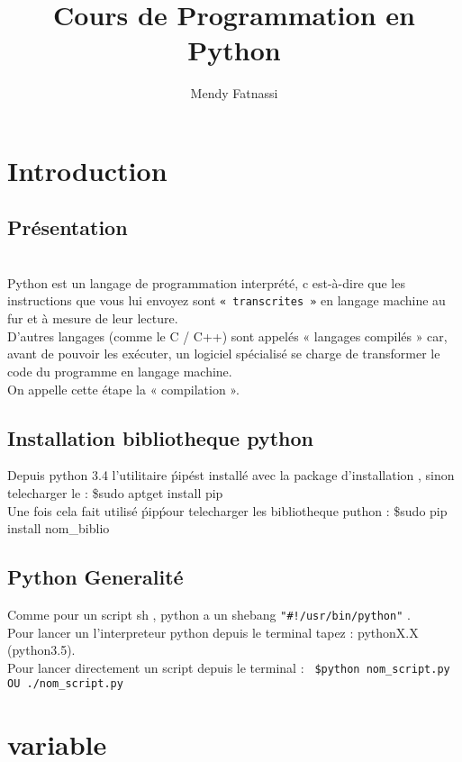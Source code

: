 \documentclass[a4paper,12pt,openany]{book}
\author{Mendy Fatnassi}
\title{Cours de Programmation en Python}
\begin{document}
\maketitle
\tableofcontents


\chapter{Introduction}
\section{Pr\'esentation}
\\
Python est un langage de programmation interpr\'et\'e, c est-à-dire que les instructions que vous lui envoyez sont \verb+« transcrites »+ en langage machine au fur et à mesure de leur lecture.\\
 D'autres langages (comme le C / C++) sont appelés « langages compil\'es » car, avant de pouvoir les ex\'ecuter, un logiciel spécialisé se charge de transformer le code du programme en langage machine.\\
On appelle cette \'etape la « compilation ».\\

\section{Installation bibliotheque python}
Depuis python 3.4 l'utilitaire \'pip\' est installé avec la package d'installation , sinon telecharger le : \$sudo apt\-get install pip \\
Une fois cela fait utilisé  \'pip\' pour telecharger les bibliotheque puthon : \$sudo pip install nom\_biblio \\

\section{Python Generalité}

Comme pour un script sh , python a un shebang \verb+"#!/usr/bin/python"+ .\\
Pour lancer un l'interpreteur python depuis le terminal tapez : pythonX.X (python3.5).\\
Pour lancer directement un script depuis le terminal : \verb + $python nom_script.py OU ./nom_script.py +\\

\chapter{variable}
\end{document}
